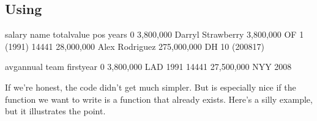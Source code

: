 \documentclass[letterpaper,10pt,english]{jupyterBook}
\begin{document}
\subsection{Using }
\label{\detokenize{chapter-11-processing-rows:using-apply}}
\begin{sphinxVerbatim}[commandchars=\\\{\}]
         
     \PYG{p}{[}\PYG{p}{]}  
          \PYG{p}{[}\PYG{p}{]}   
          \PYG{p}{[}\PYG{p}{]}   
\PYG{p}{[}\PYG{p}{]}  \PYG{p}{[}\PYG{p}{]}  

\PYG{p}{[}\PYG{p}{[}\PYG{p}{]}\PYG{p}{]} 
\end{sphinxVerbatim}

\begin{sphinxVerbatim}[commandchars=\\\{\}]
             salary               name    total\PYGZus{}value pos         years  \PYGZbs{}
0       \PYGZdl{} 3,800,000  Darryl Strawberry    \PYGZdl{} 3,800,000  OF      1 (1991)   
14441  \PYGZdl{} 28,000,000     Alex Rodriguez  \PYGZdl{} 275,000,000  DH  10 (2008\PYGZhy{}17)   

         avg\PYGZus{}annual team  first\PYGZus{}year  
0       \PYGZdl{} 3,800,000  LAD        1991  
14441  \PYGZdl{} 27,500,000  NYY        2008  
\end{sphinxVerbatim}

\sphinxAtStartPar
If we’re honest, the code didn’t get  much simpler.  But  is especially nice if the function we want to write is a function that already exists.  Here’s a silly example, but it illustrates the point.
\end{document}
